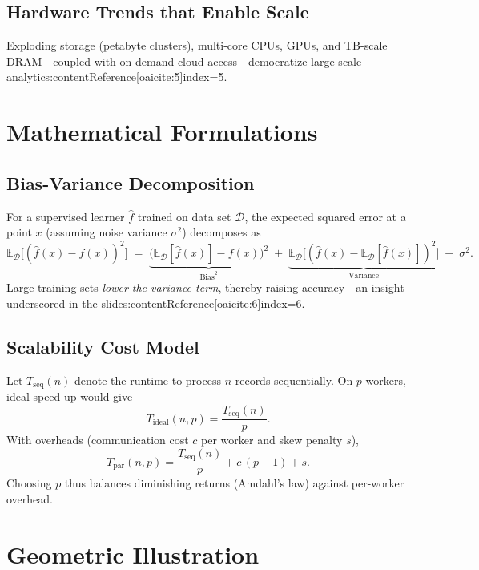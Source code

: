 \documentclass[11pt]{article}
\begin{document}
\subsection{Hardware Trends that Enable Scale}
Exploding storage (petabyte clusters), multi-core CPUs, GPUs, and TB-scale DRAM—coupled with on-demand cloud access—democratize large-scale analytics:contentReference[oaicite:5]{index=5}.

\section{Mathematical Formulations}

\subsection{Bias-Variance Decomposition}

For a supervised learner $\hat f$ trained on data set $\mathcal D$, the expected squared error at a point $x$ (assuming noise variance $\sigma^{2}$) decomposes as
\[
\mathbb E_{\mathcal D}\!\bigl[(\hat f(x)-f(x))^{2}\bigr]
  \;=\;
  \underbrace{\bigl(\mathbb E_{\mathcal D}[\hat f(x)]-f(x)\bigr)^{2}}_{\text{Bias}^{2}}
  \;+\;
  \underbrace{\mathbb E_{\mathcal D}\bigl[(\hat f(x)-\mathbb E_{\mathcal D}[\hat f(x)])^{2}\bigr]}_{\text{Variance}}
  \;+\;
  \sigma^{2}.
\]
Large training sets \emph{lower the variance term}, thereby raising accuracy—an insight underscored in the slides:contentReference[oaicite:6]{index=6}.

\subsection{Scalability Cost Model}

Let $T_{\text{seq}}(n)$ denote the runtime to process $n$ records sequentially.  On $p$ workers, ideal speed-up would give
\[
T_{\text{ideal}}(n,p)=\frac{T_{\text{seq}}(n)}{p}.
\]
With overheads (communication cost $c$ per worker and skew penalty $s$),
\[
T_{\text{par}}(n,p)=\frac{T_{\text{seq}}(n)}{p}+c\,(p-1)+s.
\]
Choosing $p$ thus balances diminishing returns (Amdahl's law) against per-worker overhead.

\section{Geometric Illustration}
\end{document}
